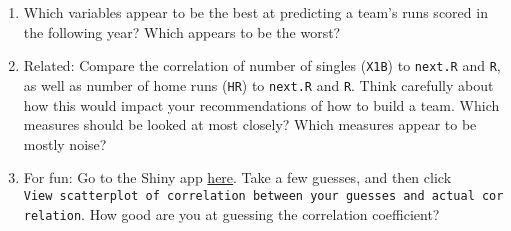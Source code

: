\documentclass[]{article}
\newenvironment{Shaded}{\begin{snugshade}}{\end{snugshade}}
\newcommand{\CommentTok}[1]{\textcolor[rgb]{0.56,0.35,0.01}{\textit{#1}}}
\newcommand{\DataTypeTok}[1]{\textcolor[rgb]{0.13,0.29,0.53}{#1}}
\newcommand{\DecValTok}[1]{\textcolor[rgb]{0.00,0.00,0.81}{#1}}
\newcommand{\KeywordTok}[1]{\textcolor[rgb]{0.13,0.29,0.53}{\textbf{#1}}}
\newcommand{\NormalTok}[1]{#1}
\newcommand{\OperatorTok}[1]{\textcolor[rgb]{0.81,0.36,0.00}{\textbf{#1}}}
\newcommand{\StringTok}[1]{\textcolor[rgb]{0.31,0.60,0.02}{#1}}
\begin{document}
\begin{Shaded}
\end{Shaded}

\begin{enumerate}
\def\labelenumi{\arabic{enumi}.}
\setcounter{enumi}{13}
\item
  Which variables appear to be the best at predicting a team's runs
  scored in the following year? Which appears to be the worst?
\item
  Related: Compare the correlation of number of singles (\texttt{X1B})
  to \texttt{next.R} and \texttt{R}, as well as number of home runs
  (\texttt{HR}) to \texttt{next.R} and \texttt{R}. Think carefully about
  how this would impact your recommendations of how to build a team.
  Which measures should be looked at most closely? Which measures appear
  to be mostly noise?
\item
  For fun: Go to the Shiny app
  \href{https://istats.shinyapps.io/guesscorr/}{here}. Take a few
  guesses, and then click
  \texttt{View\ scatterplot\ of\ correlation\ between\ your\ guesses\ and\ actual\ correlation}.
  How good are you at guessing the correlation coefficient?
\end{enumerate}
\end{document}
